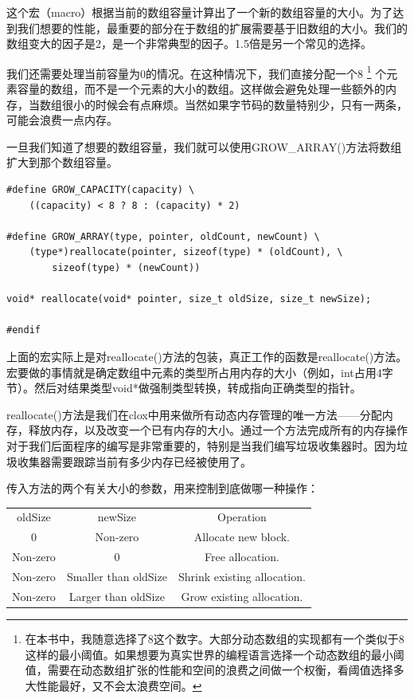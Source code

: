 \documentclass[cn,10pt,math=newtx,citestyle=gb7714-2015,bibstyle=gb7714-2015]{elegantbook}
\newenvironment{code}{\captionsetup{type=listing}}{}
\begin{document}
这个宏（macro）根据当前的数组容量计算出了一个新的数组容量的大小。为了达到我们想要的性能，最重要的部分在于数组的扩展需要基于旧数组的大小。我们的数组变大的因子是2，是一个非常典型的因子。1.5倍是另一个常见的选择。

我们还需要处理当前容量为0的情况。在这种情况下，我们直接分配一个8 \footnote{在本书中，我随意选择了8这个数字。大部分动态数组的实现都有一个类似于8这样的最小阈值。如果想要为真实世界的编程语言选择一个动态数组的最小阈值，需要在动态数组扩张的性能和空间的浪费之间做一个权衡，看阈值选择多大性能最好，又不会太浪费空间。} 个元素容量的数组，而不是一个元素的大小的数组。这样做会避免处理一些额外的内存，当数组很小的时候会有点麻烦。当然如果字节码的数量特别少，只有一两条，可能会浪费一点内存。

一旦我们知道了想要的数组容量，我们就可以使用GROW\_ARRAY()方法将数组扩大到那个数组容量。

\begin{code}
\begin{verbatim}
#define GROW_CAPACITY(capacity) \
    ((capacity) < 8 ? 8 : (capacity) * 2)

#define GROW_ARRAY(type, pointer, oldCount, newCount) \
    (type*)reallocate(pointer, sizeof(type) * (oldCount), \
        sizeof(type) * (newCount))

void* reallocate(void* pointer, size_t oldSize, size_t newSize);

#endif
\end{verbatim}
\end{code}

上面的宏实际上是对reallocate()方法的包装，真正工作的函数是reallocate()方法。宏要做的事情就是确定数组中元素的类型所占用内存的大小（例如，int占用4字节）。然后对结果类型void*做强制类型转换，转成指向正确类型的指针。

reallocate()方法是我们在clox中用来做所有动态内存管理的唯一方法——分配内存，释放内存，以及改变一个已有内存的大小。通过一个方法完成所有的内存操作对于我们后面程序的编写是非常重要的，特别是当我们编写垃圾收集器时。因为垃圾收集器需要跟踪当前有多少内存已经被使用了。

传入方法的两个有关大小的参数，用来控制到底做哪一种操作：

\begin{center}
\begin{tabular}{ |c|c|c| }
\hline
oldSize & newSize & Operation \\
0 & Non‑zero & Allocate new block. \\
Non‑zero & 0 & Free allocation. \\
Non‑zero & Smaller than oldSize & Shrink existing allocation. \\
Non‑zero & Larger than oldSize & Grow existing allocation. \\
\hline
\end{tabular}
\end{center}
\end{document}
